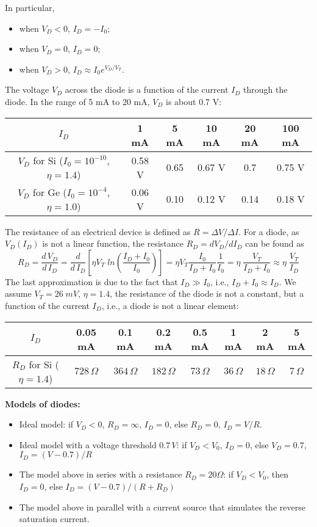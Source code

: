 In particular, 
\begin{itemize}
\item when $V_D<0$, $I_D=-I_0$; 
\item when $V_D=0$, $I_D=0$; 
\item when $V_D>0$, $I_D\approx I_0 e^{V_D/V_T}$.
\end{itemize}


The voltage $V_D$ across the diode is a function of the current $I_D$ through 
the diode. In the range of 5 mA to 20 mA, $V_D$ is about 0.7 V:

\begin{tabular}{c||c|c|c|c|c}\\ \hline
$I_D$	& 1 mA & 5 mA & 10 mA & 20 mA & 100 mA	\\ \hline
$V_D$ for Si ($I_0=10^{-10}$, $\eta=1.4$) & 0.58 V & 0.65 & 0.67 V & 0.7 & 0.75 V \\
$V_D$ for Ge ($I_0=10^{-4}$, $\eta=1.0$) & 0.06 V & 0.10 & 0.12 V & 0.14 & 0.18 V \\
\end{tabular}


The resistance of an electrical device is defined as $R=\Delta V/\Delta I$.
For a diode, as $V_D(I_D)$ is not a linear function, the resistance 
$R_D=dV_D/dI_D$ can be found as
\[
R_D=\frac{d\,V_D}{d\,I_D}=\frac{d}{d\,I_D} \left[\eta V_T\;ln \left(\frac{I_D+I_0}{I_0}\right) \right]
=\eta V_T \frac{I_0}{I_D+I_0}\frac{1}{I_0}=\eta \; \frac{V_T}{I_D+I_0}
\approx \eta \; \frac{V_T}{I_D}	
\]
The last approximation is due to the fact that $I_D \gg I_0$, i.e., 
$I_D+I_0\approx I_D$. We assume $V_T=26\;mV$, $\eta=1.4$, the resistance
of the diode is not a constant, but a function of the current $I_D$, i.e., 
a diode is not a linear element:

\begin{tabular}{c||c|c|c|c|c|c|c}\\ \hline
$I_D$	& 0.05 mA & 0.1 mA & 0.2 mA & 0.5 mA & 1 mA & 2 mA & 5 mA \\ \hline
$R_D$ for Si ($\eta=1.4$) & $728\,\Omega$ & $364\,\Omega$ & $182\,\Omega$ & 
  $73\,\Omega$ & $36\,\Omega$ & $18\,\Omega$ & $7\,\Omega$ \\
\end{tabular}


{\bf Models of diodes:}


\begin{itemize}
\item Ideal model: 
  if $V_D<0$, $R_D=\infty$, $I_D=0$, else $R_D=0$, $I_D=V/R$.
\item Ideal model with a voltage threshold $0.7\,V$:
  if $V_D<V_0$, $I_D=0$, else $V_D=0.7$, $I_D=(V-0.7)/R$
\item The model above in series with a resistance $R_D=20\Omega$:
  if $V_D<V_0$, then $I_D=0$, else $I_D=(V-0.7)/(R+R_D)$
\item The model above in parallel with a current source that simulates
  the reverse saturation current.
\end{itemize}

